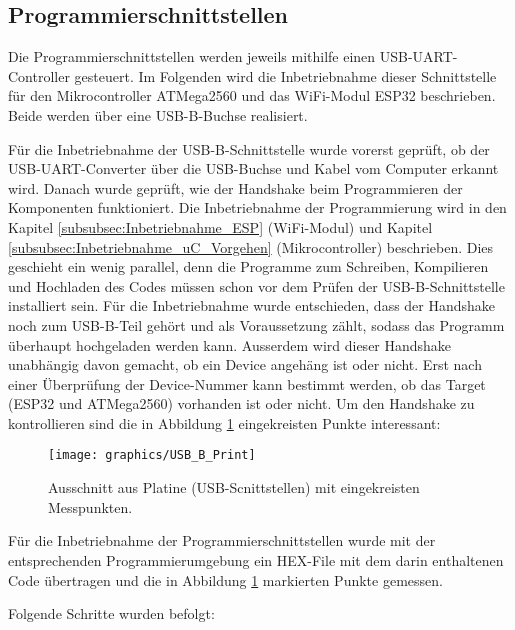 \newpage
\subsection{Programmierschnittstellen}
\label{sec:Inbetriebnahme_Programmierschnittstellen}

Die Programmierschnittstellen werden jeweils mithilfe einen USB-UART-Controller gesteuert. Im Folgenden wird die Inbetriebnahme dieser Schnittstelle für den Mikrocontroller ATMega2560 und das WiFi-Modul ESP32 beschrieben. Beide werden über eine USB-B-Buchse realisiert.

Für die Inbetriebnahme der USB-B-Schnittstelle wurde vorerst geprüft, ob der USB-UART-Converter über die USB-Buchse und Kabel vom Computer erkannt wird. Danach wurde geprüft, wie der Handshake beim Programmieren der Komponenten funktioniert. Die Inbetriebnahme der Programmierung wird in den Kapitel \ref{subsubsec:Inbetriebnahme_ESP} (WiFi-Modul) und Kapitel \ref{subsubsec:Inbetriebnahme_uC_Vorgehen} (Mikrocontroller) beschrieben. Dies geschieht ein wenig parallel, denn die Programme zum Schreiben, Kompilieren und Hochladen des Codes müssen schon vor dem Prüfen der USB-B-Schnittstelle installiert sein. Für die Inbetriebnahme wurde entschieden, dass der Handshake noch zum USB-B-Teil gehört und als Voraussetzung zählt, sodass das Programm überhaupt hochgeladen werden kann. Ausserdem wird dieser Handshake unabhängig davon gemacht, ob ein Device angehäng ist oder nicht. Erst nach einer Überprüfung der Device-Nummer kann bestimmt werden, ob das Target (ESP32 und ATMega2560) vorhanden ist oder nicht. Um den Handshake zu kontrollieren sind die in Abbildung \ref{fig:USB_B_Print} eingekreisten Punkte interessant:


\begin{figure}[h!]
\center
\texttt{[image: graphics/USB\_B\_Print]}
\caption{Ausschnitt aus Platine (USB-Scnittstellen) mit eingekreisten Messpunkten.}
\label{fig:USB_B_Print}
\end{figure}


Für die Inbetriebnahme der Programmierschnittstellen wurde mit der entsprechenden Programmierumgebung ein HEX-File mit dem darin enthaltenen Code übertragen und die in Abbildung \ref{fig:USB_B_Print} markierten Punkte gemessen.

Folgende Schritte wurden befolgt:

